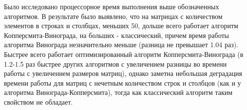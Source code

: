 \documentclass[12pt]{report}
\begin{document}
    Было исследовано процессорное время выполнения выше обозначенных алгоритмов.
    В результате было выявлено, что на матрицах с количеством элементов в строках и столбцах,
    меньших 50, дольше всего работает алгоритм Копперсмита-Винограда, на больших - классический,
    причем время работы алгоритма Винограда незначительно меньше (разница не превышает 1.04 раз).
    Быстрее всего работает оптимизированный алгоритм Копперсмита-Винограда
    (в 1.2-1.5 раз быстрее других алгоритмов с увеличением разницы во времени работы с увеличением размеров матриц),
    однако заметна небольшая деградация времени работы для матриц с нечетным количеством строк и столбцов
    (как и у алгоритма Винограда-Копперсмита),
    тогда как классический алгоритм таким свойством не обладает.


    \newpage

\end{document}
